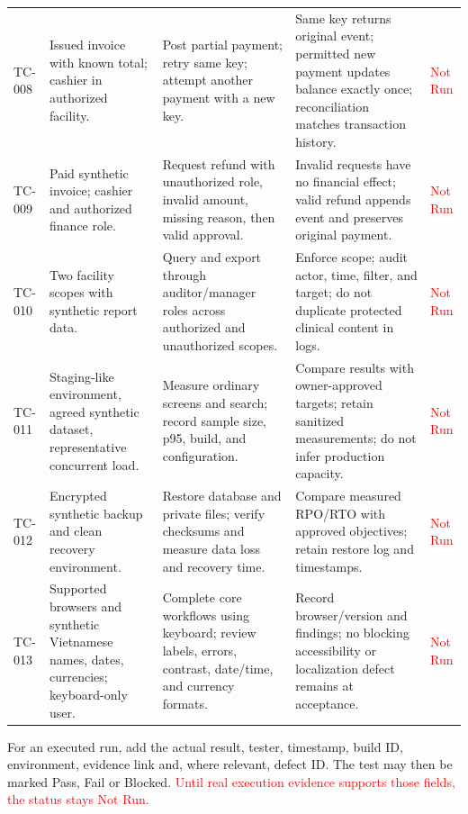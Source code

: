 \documentclass[a4paper,12pt]{article}
\newcommand{\weak}[1]{\textcolor{red}{#1}}
\begin{document}
\begin{longtable}{@{}p{}p{}p{}p{}p{}@{}}
TC-008 & Issued invoice with known total; cashier in authorized facility. & Post partial payment; retry same key; attempt another payment with a new key. & Same key returns original event; permitted new payment updates balance exactly once; reconciliation matches transaction history. & \weak{Not Run} \\
TC-009 & Paid synthetic invoice; cashier and authorized finance role. & Request refund with unauthorized role, invalid amount, missing reason, then valid approval. & Invalid requests have no financial effect; valid refund appends event and preserves original payment. & \weak{Not Run} \\
TC-010 & Two facility scopes with synthetic report data. & Query and export through auditor/manager roles across authorized and unauthorized scopes. & Enforce scope; audit actor, time, filter, and target; do not duplicate protected clinical content in logs. & \weak{Not Run} \\
TC-011 & Staging-like environment, agreed synthetic dataset, representative concurrent load. & Measure ordinary screens and search; record sample size, p95, build, and configuration. & Compare results with owner-approved targets; retain sanitized measurements; do not infer production capacity. & \weak{Not Run} \\
TC-012 & Encrypted synthetic backup and clean recovery environment. & Restore database and private files; verify checksums and measure data loss and recovery time. & Compare measured RPO/RTO with approved objectives; retain restore log and timestamps. & \weak{Not Run} \\
TC-013 & Supported browsers and synthetic Vietnamese names, dates, currencies; keyboard-only user. & Complete core workflows using keyboard; review labels, errors, contrast, date/time, and currency formats. & Record browser/version and findings; no blocking accessibility or localization defect remains at acceptance. & \weak{Not Run} \\
\bottomrule
\end{longtable}
\endgroup

For an executed run, add the actual result, tester, timestamp, build ID, environment, evidence link and, where relevant, defect ID. The test may then be marked Pass, Fail or Blocked. \weak{Until real execution evidence supports those fields, the status stays Not Run.}

\clearpage
{}
{}
\renewcommand{\refname}{References}
\setlength{\bibsep}{0.45\baselineskip}
\renewcommand{\bibfont}{\small\raggedright}


\end{document}

